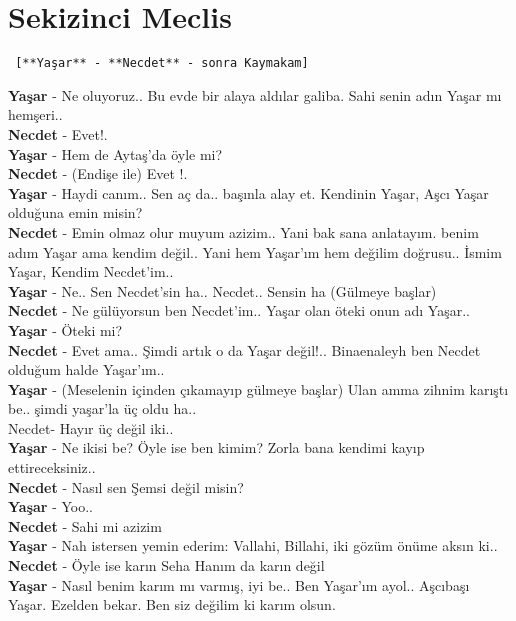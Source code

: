 \documentclass[]{book}
\begin{document}
\hypertarget{sekizinci-meclis-2}{%
\section{Sekizinci Meclis}\label{sekizinci-meclis-2}}

\begin{verbatim}
 [**Yaşar** - **Necdet** - sonra Kaymakam]
\end{verbatim}

\textbf{Yaşar} - Ne oluyoruz.. Bu evde bir alaya aldılar galiba. Sahi senin adın Yaşar mı hemşeri..\\
\textbf{Necdet} - Evet!.\\
\textbf{Yaşar} - Hem de Aytaş'da öyle mi?\\
\textbf{Necdet} - (Endişe ile) Evet !.\\
\textbf{Yaşar} - Haydi canım.. Sen aç da.. başınla alay et. Kendinin Yaşar, Aşcı Yaşar olduğuna emin misin?\\
\textbf{Necdet} - Emin olmaz olur muyum azizim.. Yani bak sana anlatayım. benim adım Yaşar ama kendim değil.. Yani hem Yaşar'ım hem değilim doğrusu.. İsmim Yaşar, Kendim Necdet'im..\\
\textbf{Yaşar} - Ne.. Sen Necdet'sin ha.. Necdet.. Sensin ha (Gülmeye başlar)\\
\textbf{Necdet} - Ne gülüyorsun ben Necdet'im.. Yaşar olan öteki onun adı Yaşar..\\
\textbf{Yaşar} - Öteki mi?\\
\textbf{Necdet} - Evet ama.. Şimdi artık o da Yaşar değil!.. Binaenaleyh ben Necdet olduğum halde Yaşar'ım..\\
\textbf{Yaşar} - (Meselenin içinden çıkamayıp gülmeye başlar) Ulan amma zihnim karıştı be.. şimdi yaşar'la üç oldu ha..\\
Necdet- Hayır üç değil iki..\\
\textbf{Yaşar} - Ne ikisi be? Öyle ise ben kimim? Zorla bana kendimi kayıp ettireceksiniz..\\
\textbf{Necdet} - Nasıl sen Şemsi değil misin?\\
\textbf{Yaşar} - Yoo..\\
\textbf{Necdet} - Sahi mi azizim\\
\textbf{Yaşar} - Nah istersen yemin ederim: Vallahi, Billahi, iki gözüm önüme aksın ki..\\
\textbf{Necdet} - Öyle ise karın Seha Hanım da karın değil\\
\textbf{Yaşar} - Nasıl benim karım mı varmış, iyi be.. Ben Yaşar'ım ayol.. Aşcıbaşı Yaşar. Ezelden bekar. Ben siz değilim ki karım olsun.\\
\end{document}
